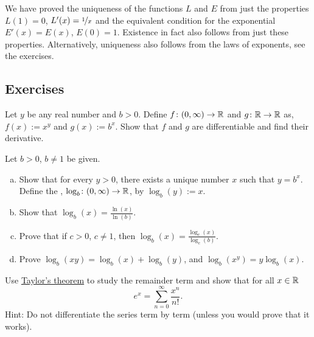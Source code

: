 \begin{remark}
We have proved the uniqueness of the functions $L$ and $E$ from
just the properties $L(1)=0$, $L'(x) = \nicefrac{1}{x}$
and the equivalent condition for the exponential
$E'(x) = E(x)$, $E(0) = 1$.  Existence in fact also follows
from just these properties.
Alternatively, uniqueness also follows
from the laws of exponents, see the exercises.
\end{remark}

\subsection{Exercises}

\begin{exercise}
Let $y$ be any real number and $b > 0$.  Define $f \colon (0,\infty) \to {\mathbb{R}}$
and $g \colon {\mathbb{R}} \to {\mathbb{R}}$ as, $f(x) := x^y$ and $g(x) := b^x$.  Show that $f$
and $g$ are differentiable and find their derivative.
\end{exercise}

\begin{samepage}
\begin{exercise}
Let $b > 0$, $b\neq 1$ be given.
\begin{enumerate}[a)]
\item
Show that for every $y > 0$, there exists a unique number $x$
such that $y = b^x$.  Define
the \emph{},
$\log_b \colon (0,\infty) \to {\mathbb{R}}$, by
$\log_b(y) := x$.
\item
Show that $\log_b(x) = \frac{\ln(x)}{\ln(b)}$.
\item
Prove that if $c > 0$, $c \neq 1$, then
$\log_b(x) = \frac{\log_c(x)}{\log_c(b)}$.
\item
Prove $\log_b(xy) =
\log_b(x)+\log_b(y)$, and $\log_b(x^y) = y \log_b(x)$.
\end{enumerate}
\end{exercise}
\end{samepage}

\begin{exercise}
Use \hyperref[thm:taylor]{Taylor's theorem} to study the remainder term and show that for
all $x \in {\mathbb{R}}$
\begin{equation*}
e^x = \sum_{n=0}^\infty \frac{x^n}{n!} .
\end{equation*}
Hint: Do not differentiate the series term by term (unless you would prove that it
works).
\end{exercise}


